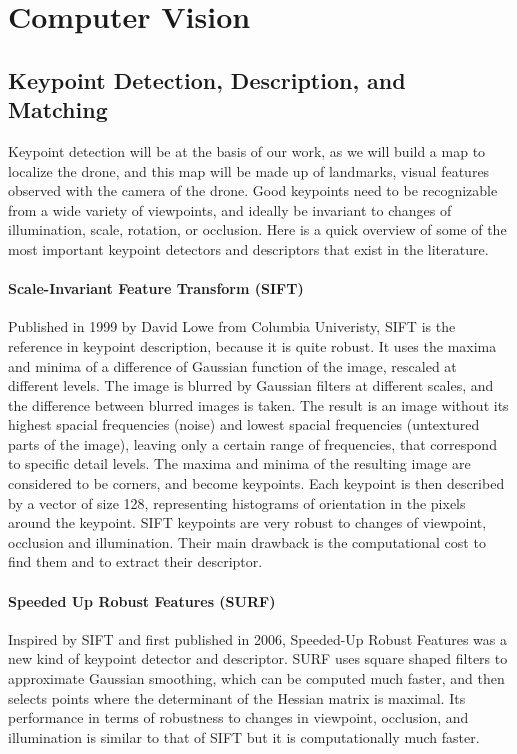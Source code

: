 \section{Computer Vision}
\subsection{Keypoint Detection, Description, and Matching} \label{sec:sota_keypoints}
Keypoint detection will be at the basis of our work, as we will build a map to localize the drone, and this map will be made up of landmarks, visual features observed with the camera of the drone. Good keypoints need to be recognizable from a wide variety of viewpoints, and ideally be invariant to changes of illumination, scale, rotation, or occlusion. Here is a quick overview of some of the most important keypoint detectors and descriptors that exist in the literature.\\

\paragraph{Scale-Invariant Feature Transform (SIFT)} Published in 1999 by David Lowe from Columbia Univeristy, SIFT \cite{sift} is the reference in keypoint description, because it is quite robust. It uses the maxima and minima of a difference of Gaussian function of the image, rescaled at different levels. The image is blurred by Gaussian filters at different scales, and the difference between blurred images is taken. The result is an image without its highest spacial frequencies (noise) and lowest spacial frequencies (untextured parts of the image), leaving only a certain range of frequencies, that correspond to specific detail levels. The maxima and minima of the resulting image are considered to be corners, and become keypoints. Each keypoint is then described by a vector of size \num{128}, representing histograms of orientation in the pixels around the keypoint. SIFT keypoints are very robust to changes of viewpoint, occlusion and illumination. Their main drawback is the computational cost to find them and to extract their descriptor.

\paragraph{Speeded Up Robust Features (SURF)} %
Inspired by SIFT and first published in 2006, Speeded-Up Robust Features \cite{surf} was a new kind of keypoint detector and descriptor. SURF uses square shaped filters to approximate Gaussian smoothing, which can be computed much faster, and then selects points where the determinant of the Hessian matrix is maximal. Its performance in terms of robustness to changes in viewpoint, occlusion, and illumination is similar to that of SIFT but it is computationally much faster.


